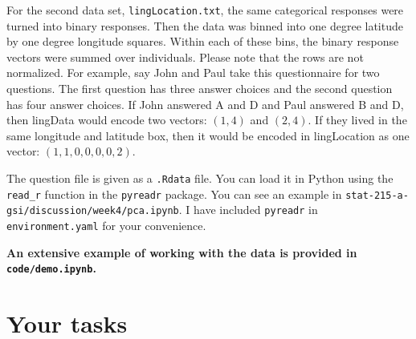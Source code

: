 \documentclass[letterpaper,12pt]{article}
\begin{document}
For the second data set, \texttt{lingLocation.txt}, the same categorical responses were turned into binary responses. Then the data was binned into one degree latitude by one degree longitude squares. Within each of these bins, the binary response vectors were summed over individuals. Please note that the rows are not normalized. For example, say John and Paul take this questionnaire for two questions. The first question has three answer choices and the second question has four answer choices. If John answered A and D and Paul answered B and D, then lingData would encode two vectors: $(1, 4)$ and $(2, 4)$. If they lived in the same longitude and latitude box, then it would be encoded in lingLocation as one vector: $(1, 1, 0, 0, 0, 0, 2)$.

The question file is given as a \texttt{.Rdata} file. You can load it in Python using the \texttt{read\_r} function in the \texttt{pyreadr} package. You can see an example in \texttt{stat-215-a-gsi/discussion/week4/pca.ipynb}. I have included \texttt{pyreadr} in \texttt{environment.yaml} for your convenience.

\textbf{An extensive example of working with the data is provided in \texttt{code/demo.ipynb}.}

\section{Your tasks}
\end{document}
